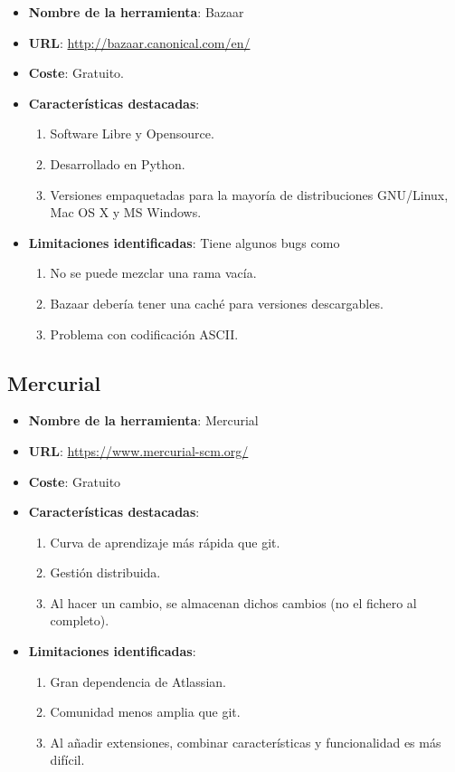 \begin{itemize}
	\item \textbf{Nombre de la herramienta}: Bazaar
	\item \textbf{URL}: \url{http://bazaar.canonical.com/en/}
	\item \textbf{Coste}: Gratuito.
	\item \textbf{Características destacadas}:
	\begin{enumerate}
		\item Software Libre y Opensource.
		\item Desarrollado en Python.
		\item Versiones empaquetadas para la mayoría de distribuciones GNU/Linux, Mac OS X y MS Windows.
	\end{enumerate}
	\item \textbf{Limitaciones identificadas}: Tiene algunos bugs como
	\begin{enumerate}
		\item No se puede mezclar una rama vacía.
		\item Bazaar debería tener una caché para versiones descargables.
		\item Problema con codificación ASCII.
	\end{enumerate}
\end{itemize}

\subsection{Mercurial}

\begin{itemize}
	\item \textbf{Nombre de la herramienta}: Mercurial
	\item \textbf{URL}: \url{https://www.mercurial-scm.org/}
	\item \textbf{Coste}: Gratuito
	\item \textbf{Características destacadas}:
	\begin{enumerate}
		\item Curva de aprendizaje más rápida que git.
		\item Gestión distribuida.
		\item Al hacer un cambio, se almacenan dichos cambios (no el fichero al completo).
	\end{enumerate}
	\item \textbf{Limitaciones identificadas}:
	\begin{enumerate}
		\item Gran dependencia de Atlassian.
		\item Comunidad menos amplia que git.
		\item Al añadir extensiones, combinar características y funcionalidad es más difícil. 
	\end{enumerate}
\end{itemize}

